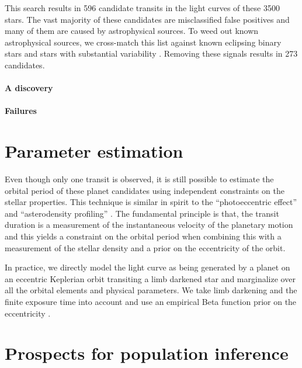 \documentclass[12pt,preprint]{aastex}
\newcommand{\sectlabel}[1]{\label{sect:#1}}
\begin{document}
This search results in 596 candidate transits in the light curves of these
3500 stars.
The vast majority of these candidates are misclassified false positives and
many of them are caused by astrophysical sources.
To weed out known astrophysical sources, we cross-match this list against
known eclipsing binary stars \citep{Matijevic:2012} and stars with substantial
variability \citep{McQuillan:2014}.
Removing these signals results in 273 candidates.



\paragraph{A discovery}


\paragraph{Failures}



\section{Parameter estimation}\sectlabel{params}

Even though only one transit is observed, it is still possible to estimate the
orbital period of these planet candidates using independent constraints on the
stellar properties.
This technique is similar in spirit to the ``photoeccentric effect''
\citep{Dawson:2012} and ``asterodensity profiling'' \citep{Kipping:2012}.
The fundamental principle is that, the transit duration is a measurement of
the instantaneous velocity of the planetary motion and this yields a
constraint on the orbital period when combining this with a measurement of the
stellar density and a prior on the eccentricity of the orbit.

In practice, we directly model the light curve as being generated by a planet
on an eccentric Keplerian orbit transiting a limb darkened star and
marginalize over all the orbital elements and physical parameters.
We take limb darkening and the finite exposure time into account
\citep{Mandel:2002, Kipping:2010, Kipping:2013} and use an empirical
Beta function prior on the eccentricity \citep{Kipping:2013a}.


\section{Prospects for population inference}\sectlabel{exopop}
\end{document}
